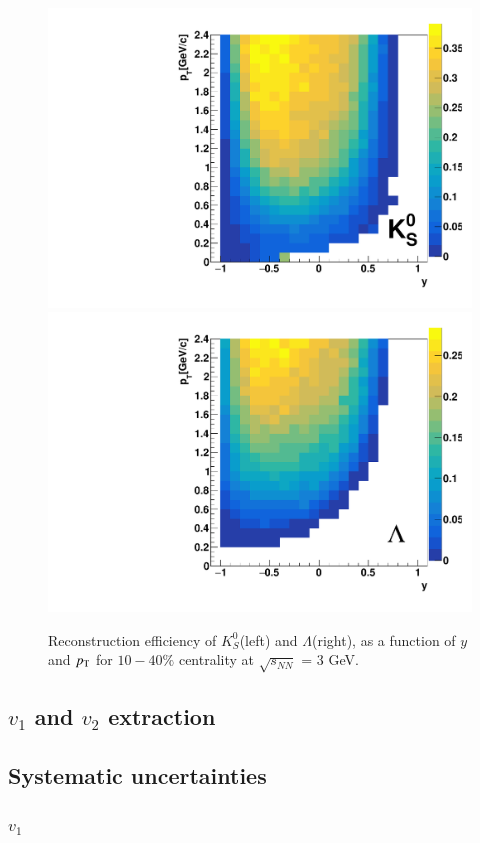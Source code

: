 \begin{figure}[h]
\includegraphics[width=0.49\linewidth]{chapterX/fig/ks_efficiency_v15.pdf}
\includegraphics[width=0.49\linewidth]{chapterX/fig/ld_efficiency_v15.pdf}
\caption{Reconstruction efficiency of $K^0_S$(left) and $\Lambda$(right), as a function of $y$ and $p_{\rm{T}}$ for $10-40\%$ centrality at $\sqrt{s_{NN}}$ = 3 GeV.}
\label{ldks_acceptance}
\end{figure}


\subsection{$v_1$ and $v_2$ extraction}
\subsection{Systematic uncertainties}
\subsubsection{$v_1$}

